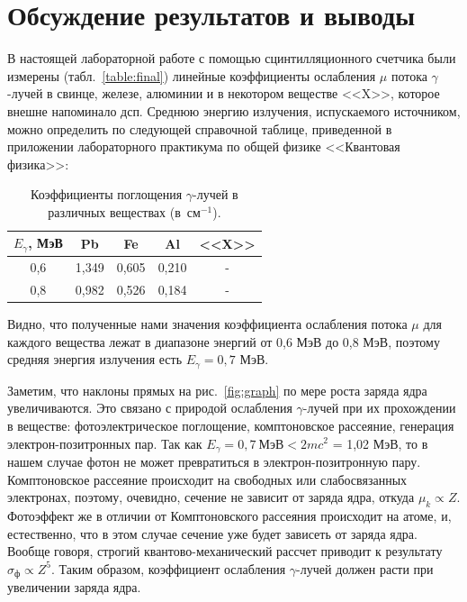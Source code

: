 \documentclass[a4paper,12pt]{article} %
\begin{document}
\section{Обсуждение результатов и выводы}
	В настоящей лабораторной работе с помощью сцинтилляционного счетчика были измерены (табл.~\ref{table:final}) линейные коэффициенты ослабления $\mu$ потока $\gamma$-лучей в свинце, железе, алюминии и в некотором веществе <<X>>, которое внешне напоминало дсп. Среднюю энергию излучения, испускаемого источником, можно определить по следующей справочной таблице, приведенной в приложении лабораторного практикума по общей физике <<Квантовая физика>>:
	\begin{table}[H]
		\caption{Коэффициенты поглощения $\gamma$-лучей в различных веществах (в~см$^{-1}$).}
		\label{table:spravocka}
		\begin{tabular}{|c|c|c|c|c|}
			\hline
			$E_\gamma$, МэВ & Pb    & Fe    & Al    & <<X>> \\ \hline
			0,6             & 1,349 & 0,605 & 0,210 & -     \\ \hline
			0,8             & 0,982 & 0,526 & 0,184 & -     \\ \hline
		\end{tabular}
	\end{table}

	Видно, что полученные нами значения коэффициента ослабления потока $\mu$ для каждого вещества лежат в диапазоне энергий от 0,6 МэВ до 0,8 МэВ, поэтому средняя энергия излучения есть $E_\gamma = 0,7$ МэВ.
	
	Заметим, что наклоны прямых на рис.~\ref{fig:graph} по мере роста заряда ядра увеличиваются. Это связано с природой ослабления $\gamma$-лучей при их прохождении в веществе: фотоэлектрическое поглощение, комптоновское рассеяние, генерация электрон-позитронных пар. Так как $E_\gamma = 0,7 \ \text{МэВ} < 2mc^2$ = 1,02 МэВ, то в нашем случае фотон не может превратиться в электрон-позитронную пару. Комптоновское рассеяние происходит на свободных или слабосвязанных электронах, поэтому, очевидно, сечение не зависит от заряда ядра, откуда $\mu_k \propto Z$. Фотоэффект же в отличии от Комптоновского рассеяния происходит на атоме, и, естественно, что в этом случае сечение уже будет зависеть от заряда ядра. Вообще говоря, строгий квантово-механический рассчет приводит к результату $\sigma_\text{ф} \propto Z^5$. Таким образом, коэффициент ослабления $\gamma$-лучей должен расти при увеличении заряда ядра. 
	

	
\end{document}
